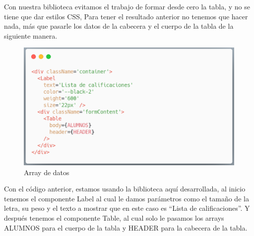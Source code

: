     Con nuestra biblioteca evitamos el trabajo de formar desde cero la tabla, y no se tiene que dar estilos  CSS, Para tener el resultado anterior no tenemos que hacer nada, más que pasarle los datos de la cabecera y el cuerpo de la tabla de la siguiente manera.
         \newline
     \begin{figure}[H]
    \includegraphics[width=1\textwidth]{./Imagenes/table-crown.png}
     \caption[Crear nuevos directorios]{Array de datos}
         \end{figure}
    \newline
    
    Con el código anterior, estamos usando la biblioteca aquí desarrollada, al inicio tenemos el componente Label al cual le damos parámetros como el tamaño de la letra, su peso y el texto a mostrar que en este caso es “Lista de calificaciones”. Y después tenemos el componente Table, al cual solo le pasamos los arrays ALUMNOS para el cuerpo de la tabla y HEADER para la cabecera de la tabla.
    
    